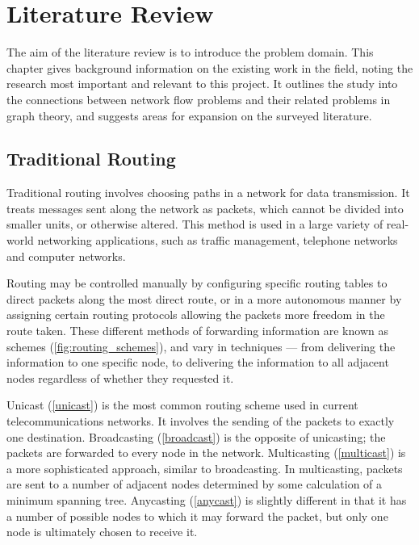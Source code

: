 
\chapter{Literature Review}
\label{ch:litrev}

The aim of the literature review is to introduce the problem domain. This chapter gives background information on the existing work in the field, noting the research most important and relevant to this project. It outlines the study into the connections between network flow problems and their related problems in graph theory, and suggests areas for expansion on the surveyed literature.

\section{Traditional Routing}
\label{sect:routing}

Traditional routing involves choosing paths in a network for data transmission. It treats messages sent along the network as packets, which cannot be divided into smaller units, or otherwise altered. This method is used in a large variety of real-world networking applications, such as traffic management, telephone networks and computer networks.

Routing may be controlled manually by configuring specific routing tables to direct packets along the most direct route, or in a more autonomous manner by assigning certain routing protocols allowing the packets more freedom in the route taken. These different methods of forwarding information are known as schemes (\autoref{fig:routing_schemes}), and vary in techniques --- from delivering the information to one specific node, to delivering the information to all adjacent nodes regardless of whether they requested it.

Unicast (\autoref{unicast}) is the most common routing scheme used in current telecommunications networks. It involves the sending of the packets to exactly one destination. Broadcasting (\autoref{broadcast}) is the opposite of unicasting; the packets are forwarded to every node in the network. Multicasting (\autoref{multicast}) is a more sophisticated approach, similar to broadcasting. In multicasting, packets are sent to a number of adjacent nodes determined by some calculation of a minimum spanning tree. Anycasting (\autoref{anycast}) is slightly different in that it has a number of possible nodes to which it may forward the packet, but only one node is ultimately chosen to receive it.

